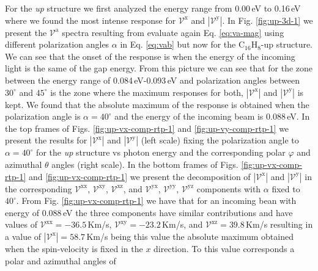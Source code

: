 \documentclass[prb,11pt,tightenlines,twocolumn,aps]{revtex4-1}
\begin{document}
For the \emph{up} structure we first analyzed the energy range from 0.00\,eV to
0.16\,eV where we found the most intense response for $\mathcal{V}^{\mathrm{x}}$
and $|\mathcal{V}^{\mathrm{y}}|$. In Fig. \ref{fig:up-3d-1} we present the
$\mathcal{V}^{\mathrm{a}}$ spectra resulting from evaluate again Eq. 
\eqref{eq:va-mag} using different polarization angles $\alpha$ in Eq.  
\eqref{eq:vab} but now for the C$_{16}$H$_{8}$-up structure. We can see that the
onset of the response is when the energy of the incoming light is the same of
the gap energy.
% 
From this picture we can see that for the zone between the energy range of
0.084\,eV-0.093\,eV and polarization angles between $30^{\circ}$ and
$45^{\circ}$ is the zone where the maximum responses for both,
$|\mathcal{V}^{\mathrm{x}}|$ and $|\mathcal{V}^{\mathrm{y}}|$ is kept.
% 
We found that the absolute maximum of the response is obtained when the
polarization angle is $\alpha=40^{\circ}$ and the energy of the incoming beam is
0.088\,eV.
%
In the top frames of  Figs. \ref{fig:up-vx-comp-rtp-1} and 
% 
\ref{fig:up-vy-comp-rtp-1} we present the results for
$|\mathcal{V}^{\mathrm{x}}|$ and $|\mathcal{V}^{\mathrm{y}}|$ (left scale)
fixing the polarization angle to $\alpha=40^{\circ}$ for the \emph{up} structure
vs photon energy and the corresponding polar $\varphi$ and azimuthal $\theta$
angles (right scale). In the bottom frames of Figs. \ref{fig:up-vx-comp-rtp-1}
% 
and \ref{fig:up-vx-comp-rtp-1} we present the decomposition of
$|\mathcal{V}^{\mathrm{x}}|$ and $|\mathcal{V}^{\mathrm{y}}|$ in the
corresponding $\mathcal{V}^{\mathrm{xx}}$, 
$\mathcal{V}^{\mathrm{xy}}$,
$\mathcal{V}^{\mathrm{xz}}$, and
$\mathcal{V}^{\mathrm{yx}}$, 
$\mathcal{V}^{\mathrm{yy}}$,
$\mathcal{V}^{\mathrm{yz}}$ 
components with $\alpha$ fixed to $40^{\circ}$. 
From Fig. \ref{fig:up-vx-comp-rtp-1} we have that for an incoming bean with
energy of 0.088\,eV the three components have similar contributions and have
values of 
% 
$\mathcal{V}^{\mathrm{xx}}=-36.5$\,Km/s,
$\mathcal{V}^{\mathrm{xy}}=-23.2$\,Km/s, and
$\mathcal{V}^{\mathrm{xz}}= 39.8$\,Km/s 
% 
resulting in a value of
% 
$|\mathcal{V}^{\mathrm{x}}|=58.7$\,Km/s 
% 
being this value the absolute maximum obtained when the spin-velocity is fixed
in the $x$ direction. To this value corresponds a polar and azimuthal angles of
\end{document}
